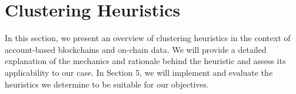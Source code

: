 \documentclass[12pt,a4paper,titlepage,oneside,english]{article}
\begin{document}

\fi


\section{Clustering Heuristics}
In this section, we present an overview of clustering heuristics in the context of account-based blockchains and on-chain data. We will provide a detailed explanation of the mechanics and rationale behind the heuristic and assess its applicability to our case. 
In Section 5, we will implement and evaluate the heuristics we determine to be suitable for our objectives.

\end{document}

